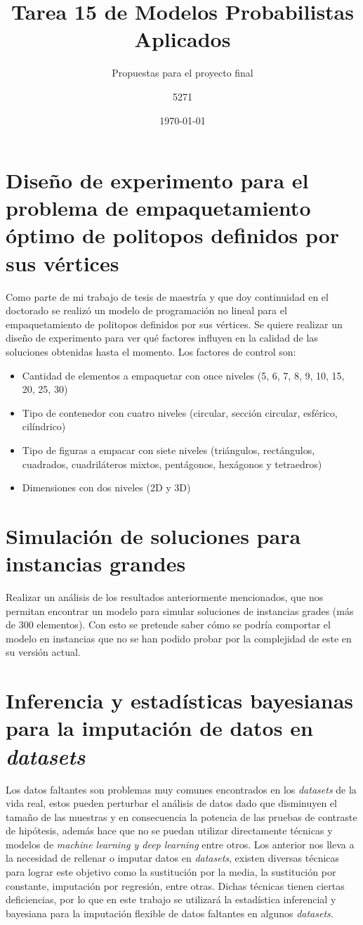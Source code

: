 \documentclass{article}
\title{Tarea 15 de Modelos Probabilistas Aplicados}
\subtitle{Propuestas para el proyecto final}
\author{5271}
\date{\today}
\begin{document}
\maketitle
\section{Diseño de experimento para el problema de empaquetamiento óptimo de politopos definidos por sus vértices}
Como parte de mi trabajo de tesis de maestría y que doy continuidad en el doctorado se realizó un modelo de programación no lineal para el empaquetamiento de politopos definidos por sus vértices. Se quiere realizar un diseño de experimento para ver qué factores influyen en la calidad de las soluciones obtenidas hasta el momento. Los factores de control son:
\begin{itemize}
    \item Cantidad de elementos a empaquetar con once niveles (5, 6, 7, 8, 9, 10, 15, 20, 25, 30)
    \item Tipo de contenedor con cuatro niveles (circular, sección circular, esférico, cilíndrico) 
    \item Tipo de figuras a empacar con siete niveles (triángulos, rectángulos, cuadrados, cuadriláteros mixtos, pentágonos, hexágonos y tetraedros)
    \item Dimensiones con dos niveles (2D y 3D)
\end{itemize}
\section{Simulación de soluciones para instancias grandes }
Realizar un análisis de los resultados anteriormente mencionados, que nos permitan encontrar un modelo para simular soluciones de instancias grades (más de 300 elementos). Con esto se pretende saber cómo se podría comportar el modelo en instancias que no se han podido probar por la complejidad de este en su versión actual.     
\section{Inferencia y estadísticas bayesianas para la imputación de datos en \textit{datasets}}
Los datos faltantes son problemas muy comunes encontrados en los \textit{datasets} de la vida real, estos pueden perturbar el análisis de datos dado que disminuyen el tamaño de las muestras y en consecuencia la potencia de las pruebas de contraste de hipótesis, además hace que no se puedan utilizar directamente técnicas y modelos de \textit{machine learning y deep learning} entre otros. Los anterior nos lleva a la necesidad de rellenar o imputar datos en \textit{datasets}, existen diversas técnicas para lograr este objetivo como la sustitución por la media, la sustitución por constante, imputación por regresión, entre otras. Dichas técnicas tienen ciertas deficiencias, por lo que en este trabajo se utilizará la estadística inferencial y bayesiana para la imputación flexible de datos faltantes en algunos \textit{datasets}.     
\newpage


\end{document}
